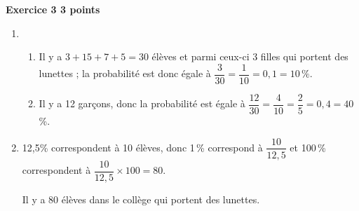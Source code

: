 \textbf{Exercice 3 \hfill 3 points}

\medskip

%
%
%
 
\begin{enumerate}
\item %
	\begin{enumerate}
		\item %
Il y a $3 + 15 + 7 + 5 = 30$ élèves  et parmi ceux-ci 3 filles qui portent des lunettes ; la probabilité est donc égale à $\dfrac{3}{30} = \dfrac{1}{10} = 0,1 = 10\,\%$. 
		\item %
		Il y a 12 garçons, donc la probabilité est égale à $\dfrac{12}{30} = \dfrac{4}{10} = \dfrac{2}{5} = 0,4 = 40$\,\%.
	\end{enumerate} 
\item %
12,5\:\% correspondent à 10 élèves, donc 1\,\% correspond à $\dfrac{10}{12,5}$ et 100\,\% correspondent à $\dfrac{10}{12,5} \times 100 = 80$.

Il y a 80 élèves dans le collège qui portent des lunettes. 
\end{enumerate} 

\vspace{0,5cm}

